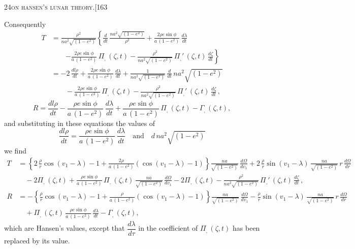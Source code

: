 \documentclass[11pt]{article}
\begin{document}
\newpage

\begin{center}
\small\textsc{24}\hfill\textsc{on hansen's lunar theory.}\hfill[163
\end{center}

\medskip

\noindent Consequently
\[
\begin{aligned}
T &= \frac{\rho^{2}}{na^{2}\sqrt{(1-e^{2})}}\!\left\{\frac{d}{dt}\,\frac{na^{2}\sqrt{(1-e^{2})}}{\rho^{2}} + \frac{2\rho e\sin\phi}{a\,(1-e^{2})}\,\frac{d\lambda}{dt}\right.\\
&\qquad\left. - \frac{2\rho e\sin\phi}{a\,(1-e^{2})}\,\Pi_{,}\,(\zeta, t) - \frac{\rho^{2}}{na^{2}\sqrt{(1-e^{2})}}\,\Pi_{,}'\,(\zeta, t)\,\frac{d\zeta}{dt}\right\}\\
&= -2\,\frac{dl\rho}{dt} + \frac{2\rho e\sin\phi}{a\,(1-e^{2})}\,\frac{d\lambda}{dt} + \frac{1}{na^{2}\sqrt{(1-e^{2})}}\,\frac{d}{dt}\,na^{2}\sqrt{(1-e^{2})}\\
&\qquad - \frac{2\rho e\sin\phi}{a\,(1-e^{2})}\,\Pi_{,}\,(\zeta, t) - \frac{\rho^{2}}{na^{2}\sqrt{(1-e^{2})}}\,\Pi_{,}'\,(\zeta, t)\,\frac{d\zeta}{dt}\,,
\end{aligned}
\]
\[
R = \frac{dl\rho}{dt} - \frac{\rho e\sin\phi}{a\,(1-e^{2})}\,\frac{d\lambda}{dt} + \frac{\rho e\sin\phi}{a\,(1-e^{2})}\,\Pi_{,}\,(\zeta, t) - \Gamma_{,}\,(\zeta, t),
\]
and substituting in these equations the values of
\[
\frac{dl\rho}{dt} = \frac{\rho e\sin\phi}{a\,(1-e^{2})}\,\frac{d\lambda}{dt} \quad\text{and}\quad d\,na^{2}\sqrt{(1-e^{2})}
\]
we find
\[
\begin{aligned}
T &= \left\{2\,\frac{\rho}{r}\cos(v_{1} - \lambda) - 1 + \frac{2\rho}{a\,(1-e^{2})}\!\left(\cos(v_{1} - \lambda) - 1\right)\right\}\frac{na}{\sqrt{(1-e^{2})}}\,\frac{d\Omega}{dv_{1}} + 2\,\frac{\rho}{r}\sin(v_{1} - \lambda)\,\frac{na}{\sqrt{(1-e^{2})}}\,r\,\frac{d\Omega}{dr}\\
&\quad - 2\Pi_{,}\,(\zeta, t) + \frac{\rho e\sin\phi}{a\,(1-e^{2})}\,\Pi_{,}\,(\zeta, t)\,\frac{na}{\sqrt{(1-e^{2})}}\,\frac{d\Omega}{dv_{1}} - 2\Pi_{,}\,(\zeta, t) - \frac{\rho^{2}}{na^{2}\sqrt{(1-e^{2})}}\,\Pi_{,}'\,(\zeta, t)\,\frac{d\zeta}{dt}\,,\\
R &= -\left\{\frac{\rho}{r}\cos(v_{1} - \lambda) - 1 + \frac{\rho}{a\,(1-e^{2})}\!\left(\cos(v_{1} - \lambda) - 1\right)\right\}\frac{na}{\sqrt{(1-e^{2})}}\,\frac{d\Omega}{dv_{1}} - \frac{\rho}{r}\sin(v_{1} - \lambda)\,\frac{na}{\sqrt{(1-e^{2})}}\,r\,\frac{d\Omega}{dr}\\
&\quad + \Pi_{,}\,(\zeta, t)\,\frac{\rho e\sin\phi}{a\,(1-e^{2})}\,\frac{d\lambda}{dt} - \Gamma_{,}\,(\zeta, t),
\end{aligned}
\]
which are Hansen's values, except that $\dfrac{d\lambda}{d\tau}$ in the coefficient of $\Pi_{,}\,(\zeta, t)$ has been replaced by its value.
\end{document}
